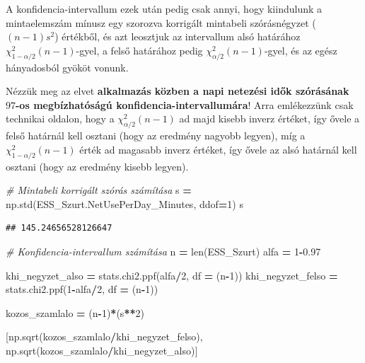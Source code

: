 \documentclass[
]{book}
\newenvironment{Shaded}{\begin{snugshade}}{\end{snugshade}}
\newcommand{\BuiltInTok}[1]{#1}
\newcommand{\CommentTok}[1]{\textcolor[rgb]{0.56,0.35,0.01}{\textit{#1}}}
\newcommand{\DecValTok}[1]{\textcolor[rgb]{0.00,0.00,0.81}{#1}}
\newcommand{\FloatTok}[1]{\textcolor[rgb]{0.00,0.00,0.81}{#1}}
\newcommand{\NormalTok}[1]{#1}
\newcommand{\OperatorTok}[1]{\textcolor[rgb]{0.81,0.36,0.00}{\textbf{#1}}}
\begin{document}
A konfidencia-intervallum ezek után pedig csak annyi, hogy kiindulunk a mintaelemszám mínusz egy szorozva korrigált mintabeli szórásnégyzet (\((n-1)s^2\)) értékből, és azt leosztjuk az intervallum alsó határához \(\chi^2_{1-\alpha/2}(n-1)\)-gyel, a felső határához pedig \(\chi^2_{\alpha/2}(n-1)\)-gyel, és az egész hányadosból gyököt vonunk.

Nézzük meg az elvet \textbf{alkalmazás közben a napi netezési idők szórásának \(97%
\)-os megbízhatóságú konfidencia-intervallumára}!
Arra emlékezzünk csak technikai oldalon, hogy a \(\chi^2_{\alpha/2}(n-1)\) ad majd kisebb inverz értéket, így ővele a felső határnál kell osztani (hogy az eredmény nagyobb legyen), míg a \(\chi^2_{1-\alpha/2}(n-1)\) érték ad magasabb inverz értéket, így ővele az alsó határnál kell osztani (hogy az eredmény kisebb legyen).

\begin{Shaded}
\begin{Highlighting}[]
\CommentTok{\# Mintabeli korrigált szórás számítása}
\NormalTok{s }\OperatorTok{=}\NormalTok{ np.std(ESS\_Szurt.NetUsePerDay\_Minutes, ddof}\OperatorTok{=}\DecValTok{1}\NormalTok{)}
\NormalTok{s}
\end{Highlighting}
\end{Shaded}

\begin{verbatim}
## 145.24656528126647
\end{verbatim}

\begin{Shaded}
\begin{Highlighting}[]
\CommentTok{\# Konfidencia{-}intervallum számítása}
\NormalTok{n }\OperatorTok{=} \BuiltInTok{len}\NormalTok{(ESS\_Szurt)}
\NormalTok{alfa }\OperatorTok{=} \DecValTok{1}\OperatorTok{{-}}\FloatTok{0.97}

\NormalTok{khi\_negyzet\_also }\OperatorTok{=}\NormalTok{ stats.chi2.ppf(alfa}\OperatorTok{/}\DecValTok{2}\NormalTok{, df }\OperatorTok{=}\NormalTok{ (n}\OperatorTok{{-}}\DecValTok{1}\NormalTok{))}
\NormalTok{khi\_negyzet\_felso }\OperatorTok{=}\NormalTok{ stats.chi2.ppf(}\DecValTok{1}\OperatorTok{{-}}\NormalTok{alfa}\OperatorTok{/}\DecValTok{2}\NormalTok{, df }\OperatorTok{=}\NormalTok{ (n}\OperatorTok{{-}}\DecValTok{1}\NormalTok{))}

\NormalTok{kozos\_szamlalo }\OperatorTok{=}\NormalTok{ (n}\OperatorTok{{-}}\DecValTok{1}\NormalTok{)}\OperatorTok{*}\NormalTok{(s}\OperatorTok{**}\DecValTok{2}\NormalTok{)}

\NormalTok{[np.sqrt(kozos\_szamlalo}\OperatorTok{/}\NormalTok{khi\_negyzet\_felso), np.sqrt(kozos\_szamlalo}\OperatorTok{/}\NormalTok{khi\_negyzet\_also)]}
\end{Highlighting}
\end{Shaded}
\end{document}
